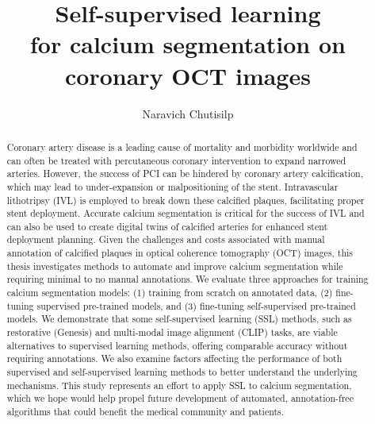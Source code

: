 \documentclass[a4paper,11pt,oneside]{report}
\title{Self-supervised learning\\for calcium segmentation on coronary OCT images}
\author{Naravich Chutisilp}
\begin{document}
\maketitle
\makededication
\makeacks

\begin{abstract}


Coronary artery disease is a leading cause of mortality and morbidity worldwide and can often be treated with percutaneous coronary intervention to expand narrowed arteries. However, the success of PCI can be hindered by coronary artery calcification, which may lead to under-expansion or malpositioning of the stent. Intravascular lithotripsy (IVL) is employed to break down these calcified plaques, facilitating proper stent deployment. Accurate calcium segmentation is critical for the success of IVL and can also be used to create digital twins of calcified arteries for enhanced stent deployment planning. Given the challenges and costs associated with manual annotation of calcified plaques in optical coherence tomography (OCT) images, this thesis investigates methods to automate and improve calcium segmentation while requiring minimal to no manual annotations. We evaluate three approaches for training calcium segmentation models: (1) training from scratch on annotated data, (2) fine-tuning supervised pre-trained models, and (3) fine-tuning self-supervised pre-trained models. We demonstrate that some self-supervised learning (SSL) methods, such as restorative (Genesis) and multi-modal image alignment (CLIP) tasks, are viable alternatives to supervised learning methods, offering comparable accuracy without requiring annotations. We also examine factors affecting the performance of both supervised and self-supervised learning methods to better understand the underlying mechanisms. This study represents an effort to apply SSL to calcium segmentation, which we hope would help propel future development of automated, annotation-free algorithms that could benefit the medical community and patients. 
\end{abstract}
\end{document}
